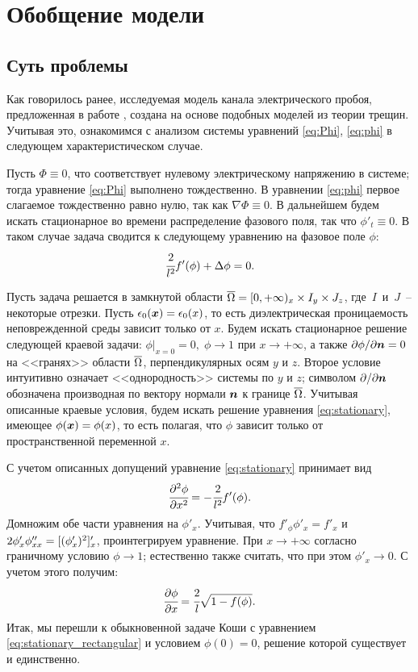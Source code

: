 
\section{Обобщение модели}

\subsection{Суть проблемы}
\label{ssec:matter_of_problem}

Как говорилось ранее, исследуемая модель канала электрического пробоя, предложенная в работе \cite{pitike_dielectric_breakdown}, создана на основе подобных моделей из теории трещин. Учитывая это, ознакомимся с анализом системы уравнений \eqref{eq:Phi}, \eqref{eq:phi} в следующем характеристическом случае.

Пусть $\Phi \equiv 0$, что соответствует нулевому электрическому напряжению в системе; тогда уравнение \eqref{eq:Phi} выполнено тождественно. В уравнении \eqref{eq:phi} первое слагаемое тождественно равно нулю, так как $\nabla \Phi \equiv 0$. В дальнейшем будем искать стационарное во времени распределение фазового поля, так что $\phi'_t \equiv 0$. В таком случае задача сводится к следующему уравнению на фазовое поле $\phi$:
\begin{equation}
	\cfrac{2}{l^2} f'(\phi) + \Delta \phi = 0 {\text{.}}
	\label{eq:stationary}
\end{equation}

Пусть задача решается в замкнутой области ${\overline{\Omega}} = [0, +\infty)_x \times I_y \times J_z$, где~$I$~и~$J$~-- некоторые отрезки. Пусть $\epsilon_0({\boldsymbol{x}}) = \epsilon_0(x)$, то есть диэлектрическая проницаемость неповрежденной среды зависит только от $x$. Будем искать стационарное решение следующей краевой задачи: $\phi|_{x = 0} = 0, \; \phi \to 1$ при $x \to +\infty$, а также $\partial \phi / \partial {\boldsymbol{n}} = 0$ на <<гранях>> области ${\overline{\Omega}}$, перпендикулярных осям $y$ и $z$. Второе условие интуитивно означает <<однородность>> системы по $y$ и $z$; символом $\partial  / \partial {\boldsymbol{n}}$ обозначена производная по вектору нормали ${\boldsymbol{n}}$ к границе ${\overline{\Omega}}$. Учитывая описанные краевые условия, будем искать решение уравнения \eqref{eq:stationary}, имеющее $\phi({\boldsymbol{x}}) = \phi(x)$, то есть полагая, что $\phi$ зависит только от пространственной переменной $x$.

С учетом описанных допущений уравнение \eqref{eq:stationary} принимает вид
$$\cfrac{\partial^2 \phi}{\partial {x}^2} = -\cfrac{2}{l^2} f'(\phi) {\text{.}}$$
Домножим обе части уравнения на $\phi'_x$. Учитывая, что $f'_\phi \phi'_x = f'_x$ и $2 \phi'_x \phi''_{xx} \hm = [(\phi'_x)^2]'_x$, проинтегрируем уравнение. При $x \to +\infty$ согласно граничному условию $\phi \to 1$; естественно также считать, что при этом $\phi'_x \to 0$. С учетом этого получим:
\begin{equation}
	\cfrac{\partial \phi}{\partial x} = \cfrac{2}{l} \sqrt{1 - f(\phi)} {\text{.}}
	\label{eq:stationary_rectangular}
\end{equation}
Итак, мы перешли к обыкновенной задаче Коши с уравнением \eqref{eq:stationary_rectangular} и условием $\phi(0) = 0$, решение которой существует и единственно.


